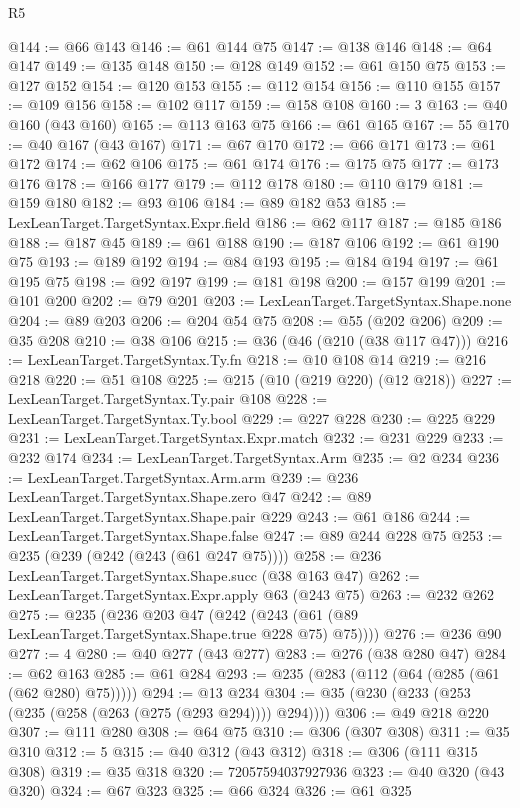 \begin{lexlean}{R5}
\begin{coremodule}
@144 := @66 @143
@146 := @61 @144 @75
@147 := @138 @146
@148 := @64 @147
@149 := @135 @148
@150 := @128 @149
@152 := @61 @150 @75
@153 := @127 @152
@154 := @120 @153
@155 := @112 @154
@156 := @110 @155
@157 := @109 @156
@158 := @102 @117
@159 := @158 @108
@160 := 3
@163 := @40 @160 (@43 @160)
@165 := @113 @163 @75
@166 := @61 @165
@167 := 55
@170 := @40 @167 (@43 @167)
@171 := @67 @170
@172 := @66 @171
@173 := @61 @172
@174 := @62 @106
@175 := @61 @174
@176 := @175 @75
@177 := @173 @176
@178 := @166 @177
@179 := @112 @178
@180 := @110 @179
@181 := @159 @180
@182 := @93 @106
@184 := @89 @182 @53
@185 := LexLeanTarget.TargetSyntax.Expr.field
@186 := @62 @117
@187 := @185 @186
@188 := @187 @45
@189 := @61 @188
@190 := @187 @106
@192 := @61 @190 @75
@193 := @189 @192
@194 := @84 @193
@195 := @184 @194
@197 := @61 @195 @75
@198 := @92 @197
@199 := @181 @198
@200 := @157 @199
@201 := @101 @200
@202 := @79 @201
@203 := LexLeanTarget.TargetSyntax.Shape.none
@204 := @89 @203
@206 := @204 @54 @75
@208 := @55 (@202 @206)
@209 := @35 @208
@210 := @38 @106
@215 := @36 (@46 (@210 (@38 @117 @47)))
@216 := LexLeanTarget.TargetSyntax.Ty.fn
@218 := @10 @108 @14
@219 := @216 @218
@220 := @51 @108
@225 := @215 (@10 (@219 @220) (@12 @218))
@227 := LexLeanTarget.TargetSyntax.Ty.pair @108
@228 := LexLeanTarget.TargetSyntax.Ty.bool
@229 := @227 @228
@230 := @225 @229
@231 := LexLeanTarget.TargetSyntax.Expr.match
@232 := @231 @229
@233 := @232 @174
@234 := LexLeanTarget.TargetSyntax.Arm
@235 := @2 @234
@236 := LexLeanTarget.TargetSyntax.Arm.arm
@239 := @236 LexLeanTarget.TargetSyntax.Shape.zero @47
@242 := @89 LexLeanTarget.TargetSyntax.Shape.pair @229
@243 := @61 @186
@244 := LexLeanTarget.TargetSyntax.Shape.false
@247 := @89 @244 @228 @75
@253 := @235 (@239 (@242 (@243 (@61 @247 @75))))
@258 := @236 LexLeanTarget.TargetSyntax.Shape.succ (@38 @163 @47)
@262 := LexLeanTarget.TargetSyntax.Expr.apply @63 (@243 @75)
@263 := @232 @262
@275 := @235
    (@236 @203 @47 (@242 (@243 (@61 (@89 LexLeanTarget.TargetSyntax.Shape.true @228 @75) @75))))
@276 := @236 @90
@277 := 4
@280 := @40 @277 (@43 @277)
@283 := @276 (@38 @280 @47)
@284 := @62 @163
@285 := @61 @284
@293 := @235 (@283 (@112 (@64 (@285 (@61 (@62 @280) @75)))))
@294 := @13 @234
@304 := @35 (@230 (@233 (@253 (@235 (@258 (@263 (@275 (@293 @294)))) @294))))
@306 := @49 @218 @220
@307 := @111 @280
@308 := @64 @75
@310 := @306 (@307 @308)
@311 := @35 @310
@312 := 5
@315 := @40 @312 (@43 @312)
@318 := @306 (@111 @315 @308)
@319 := @35 @318
@320 := 72057594037927936
@323 := @40 @320 (@43 @320)
@324 := @67 @323
@325 := @66 @324
@326 := @61 @325

\end{coremodule}
\end{lexlean}
